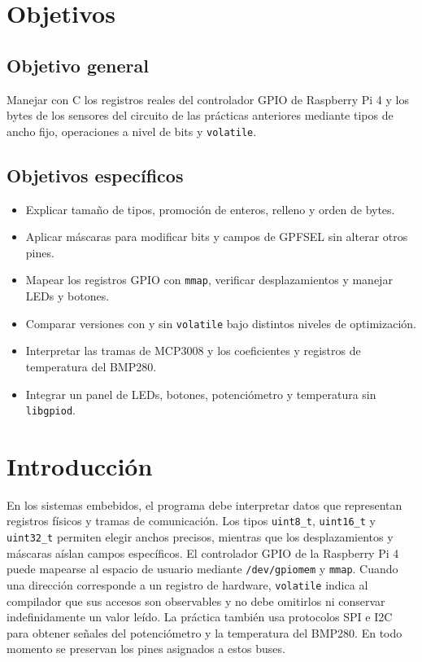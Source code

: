 \documentclass[conference]{IEEEtran}
\begin{document}
\section{Objetivos}
\subsection{Objetivo general}
Manejar con C los registros reales del controlador GPIO de Raspberry Pi 4 y los bytes de los sensores del circuito de las prácticas anteriores mediante tipos de ancho fijo, operaciones a nivel de bits y \texttt{volatile}.
\subsection{Objetivos específicos}
\begin{itemize}
\item Explicar tamaño de tipos, promoción de enteros, relleno y orden de bytes.
\item Aplicar máscaras para modificar bits y campos de GPFSEL sin alterar otros pines.
\item Mapear los registros GPIO con \texttt{mmap}, verificar desplazamientos y manejar LEDs y botones.
\item Comparar versiones con y sin \texttt{volatile} bajo distintos niveles de optimización.
\item Interpretar las tramas de MCP3008 y los coeficientes y registros de temperatura del BMP280.
\item Integrar un panel de LEDs, botones, potenciómetro y temperatura sin \texttt{libgpiod}.
\end{itemize}
\section{Introducción}
En los sistemas embebidos, el programa debe interpretar datos que representan registros físicos y tramas de comunicación. Los tipos \texttt{uint8\_t}, \texttt{uint16\_t} y \texttt{uint32\_t} permiten elegir anchos precisos, mientras que los desplazamientos y máscaras aíslan campos específicos. El controlador GPIO de la Raspberry Pi 4 puede mapearse al espacio de usuario mediante \texttt{/dev/gpiomem} y \texttt{mmap}. Cuando una dirección corresponde a un registro de hardware, \texttt{volatile} indica al compilador que sus accesos son observables y no debe omitirlos ni conservar indefinidamente un valor leído. La práctica también usa protocolos SPI e I2C para obtener señales del potenciómetro y la temperatura del BMP280. En todo momento se preservan los pines asignados a estos buses.
\end{document}
